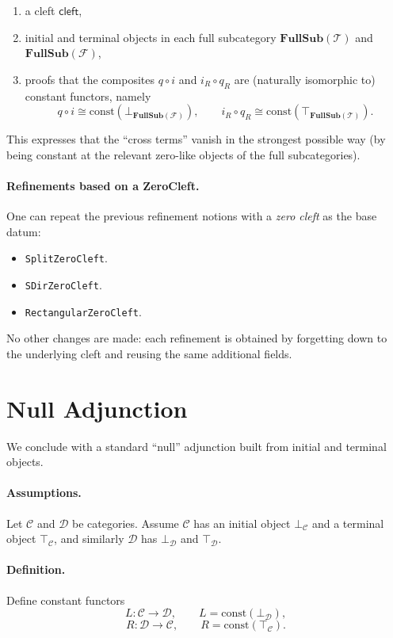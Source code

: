 \documentclass[11pt]{article}
\newcommand{\FS}[1]{\mathbf{FullSub}(#1)} %
\begin{document}
\begin{enumerate}
\item a cleft $\mathsf{cleft}$,
\item initial and terminal objects in each full subcategory $\FS{\mathcal{T}}$ and $\FS{\mathcal{F}}$,
\item proofs that the composites $q \circ i$ and $i_R \circ q_R$ are (naturally isomorphic to) constant functors,
      namely
  \[
    q \circ i \cong \mathrm{const}(\bot_{\FS{\mathcal{F}}}),
    \qquad
    i_R \circ q_R \cong \mathrm{const}(\top_{\FS{\mathcal{T}}}).
  \]
\end{enumerate}

This expresses that the ``cross terms'' vanish in the strongest possible way (by being constant at the relevant
zero-like objects of the full subcategories).

\paragraph{Refinements based on a ZeroCleft.}
One can repeat the previous refinement notions with a \emph{zero cleft} as the base datum:

\begin{itemize}
\item \texttt{SplitZeroCleft}.
\item \texttt{SDirZeroCleft}.
\item \texttt{RectangularZeroCleft}.
\end{itemize}

No other changes are made: each refinement is obtained by forgetting down to the underlying cleft and reusing the same additional fields.

\section*{Null Adjunction}

We conclude with a standard ``null'' adjunction built from initial and terminal objects.

\paragraph{Assumptions.}
Let $\mathcal{C}$ and $\mathcal{D}$ be categories.
Assume $\mathcal{C}$ has an initial object $\bot_{\mathcal{C}}$ and a terminal object $\top_{\mathcal{C}}$,
and similarly $\mathcal{D}$ has $\bot_{\mathcal{D}}$ and $\top_{\mathcal{D}}$.

\paragraph{Definition.}
Define constant functors
\[
  L : \mathcal{C} \to \mathcal{D}, \qquad L = \mathrm{const}(\bot_{\mathcal{D}}),
\]
\[
  R : \mathcal{D} \to \mathcal{C}, \qquad R = \mathrm{const}(\top_{\mathcal{C}}).
\]
\end{document}
